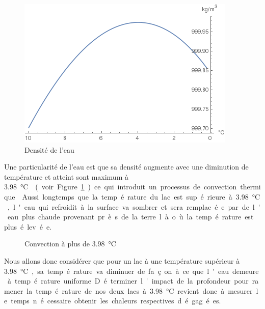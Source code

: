\documentclass[12pt]{article}
\newcommand\critical{\SI{3.98}\celsius}
\begin{document}
\begin{figure}[h]\label{water-density}
    \centering
    \includegraphics[scale=0.9]{WaterDensity.png}
    \caption{Densit\'e de l'eau}
\end{figure}

Une particularit\'e de l'eau est que sa densit\'e augmente avec une diminution de temp\'erature et
atteint sont maximum \`a \critical~\cite{WaterDensity} (voir Figure \ref{water-density}) ce qui introduit un processus de convection
thermique~\cite{ConvNat}. Aussi longtemps que la temp\'erature du lac est sup\'erieure \`a
\critical, l'eau qui refroidit \`a la surface va sombrer et sera remplac\'ee par de l'eau plus
chaude provenant pr\`es de la terre l\`a o\`u la temp\'erature est plus \'elev\'ee.

\begin{figure}[h]\label{water-convection}
    \centering
    \caption{Convection \`a plus de \critical}
\end{figure}

Nous allons donc consid\'erer que pour un lac \`a une temp\'erature sup\'erieur \`a \critical, sa
temp\'erature va diminuer de fa\c con \`a ce que l'eau demeure \`a temp\'erature uniforme.
D\'eterminer l'impact de la profondeur pour ramener la temp\'erature de nos deux lacs \`a
\critical~revient donc \`a mesurer le temps n\'ecessaire obtenir les chaleurs respectives
d\'egag\'ees.
\end{document}
